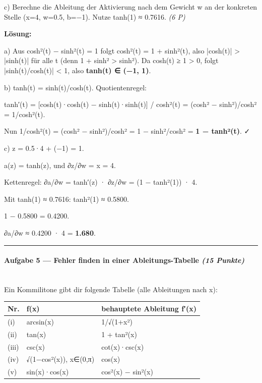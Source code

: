 \documentclass[11pt, a4paper]{article}
\begin{document}
c) Berechne die Ableitung der Aktivierung nach dem Gewicht w an der konkreten Stelle (x=4, w=0.5, b=−1). Nutze tanh(1) ≈ 0.7616. \textit{(6 P)}


\textbf{Lösung:}


a) Aus cosh²(t) − sinh²(t) = 1 folgt cosh²(t) = 1 + sinh²(t), also |cosh(t)| > |sinh(t)| für alle t (denn 1 + sinh² > sinh²). Da cosh(t) ≥ 1 > 0, folgt |sinh(t)/cosh(t)| < 1, also \textbf{tanh(t) ∈ (−1, 1)}.


b) tanh(t) = sinh(t)/cosh(t). Quotientenregel:

tanh′(t) = [cosh(t)·cosh(t) − sinh(t)·sinh(t)] / cosh²(t) = (cosh² − sinh²)/cosh² = 1/cosh²(t).


Nun 1/cosh²(t) = (cosh² − sinh²)/cosh² = 1 − sinh²/cosh² = \textbf{1 − tanh²(t)}. ✓


c) z = 0.5·4 + (−1) = 1.

a(z) = tanh(z), und ∂z/∂w = x = 4.

Kettenregel: ∂a/∂w = tanh′(z) · ∂z/∂w = (1 − tanh²(1)) · 4.


Mit tanh(1) ≈ 0.7616: tanh²(1) ≈ 0.5800.

1 − 0.5800 = 0.4200.

∂a/∂w ≈ 0.4200 · 4 = \textbf{1.680}.



\noindent\textcolor{rulegray}{\rule{\linewidth}{0.4pt}}


\paragraph{Aufgabe 5 — Fehler finden in einer Ableitungs-Tabelle \textit{(15 Punkte)}}\mbox{}\\[2pt]

Ein Kommilitone gibt dir folgende Tabelle (alle Ableitungen nach x):



{\small
\begin{tabularx}{\linewidth}{XXX}
\hline
\rowcolor{tableheadbg}
{\color{white}\textbf{Nr.}} & {\color{white}\textbf{f(x)}} & {\color{white}\textbf{behauptete Ableitung f′(x)}} \\[2pt]
\hline
\endhead
\hline
\endfoot
(i) & arcsin(x) & 1/√(1+x²) \\
(ii) & tan(x) & 1 + tan²(x) \\
(iii) & csc(x) & cot(x)·csc(x) \\
(iv) & √(1−cos²(x)), x∈(0,π) & cos(x) \\
(v) & sin(x)·cos(x) & cos²(x) − sin²(x) \\
\end{tabularx}
}
\end{document}
